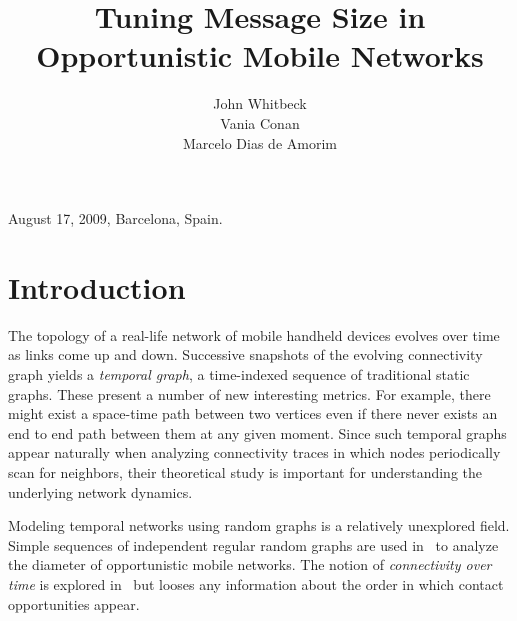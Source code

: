 \documentclass{sig-alt-release2}
\begin{document}
 {August 17, 2009, Barcelona, Spain.} 

\title{Tuning Message Size in Opportunistic Mobile Networks}


\author{
\alignauthor
John Whitbeck \\
\alignauthor
Vania Conan \\
\alignauthor
Marcelo Dias de Amorim \\
}


\maketitle







\section{Introduction}
\label{sec:introduction}
The topology of a real-life network of mobile handheld devices evolves
over time as links come up and down. Successive snapshots of the
evolving connectivity graph yields a \emph{temporal graph}, a
time-indexed sequence of traditional static graphs. These present a
number of new interesting metrics. For example, there might exist a
space-time path between two vertices even if there never exists an end
to end path between them at any given moment. Since such temporal
graphs appear naturally when analyzing connectivity traces in which
nodes periodically scan for neighbors, their theoretical study is
important for understanding the underlying network dynamics.

Modeling temporal networks using random graphs is a relatively
unexplored field. Simple sequences of independent regular random
graphs are used in~\cite{chaintreau_diam} to analyze the diameter of
opportunistic mobile networks. The notion of \emph{connectivity over
  time} is explored in~\cite{pellegrini07} but looses any information
about the order in which contact opportunities appear. 
\end{document}
